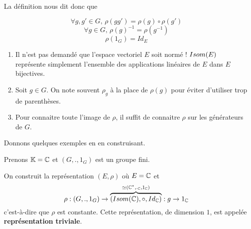 La définition nous dit donc que

\begin{equation}
	\forall g, g' \in G, \, \rho(g g') = \rho(g) \circ \rho(g')
\end{equation}
\begin{equation}
	\forall g \in G, \, \rho(g)^{-1} = \rho(g^{-1})
\end{equation}
\begin{equation}
	\rho(1_{G}) = Id_{E}
\end{equation}

\begin{remarque}
	\begin{enumerate}
		\item Il n'est pas demandé que l'espace vectoriel $E$ soit normé !
			$Isom(E)$ représente simplement l'ensemble des
			applications linéaires de $E$ dans $E$ bijectives.
		\item Soit $g \in G$. On note souvent $\rho_{g}$ à la place de $\rho(g)$
			pour éviter d'utiliser trop de parenthèses.
		\item Pour connaitre toute l'image de $\rho$, il suffit de connaitre
			$\rho$ sur les générateurs de $G$.
	\end{enumerate}
\end{remarque}

Donnons quelques exemples en en construisant.

\begin{exemple}
	Prenons $\mathbb{K} = \mathbb{C}$ et $(G, ., 1_{G})$ est un groupe fini.

	On construit la représentation $(E, \rho)$ où $E = \mathbb{C}$ et
	\begin{equation}
		\rho : (G, ., 1_{G}) \rightarrow \overbrace{(Isom(\mathbb{C}),
		\circ, Id_{\mathbb{C}})}^{\simeq (\mathbb{C}^{*}, ._{\mathbb{C}}, 1_{\mathbb{C}})} : g \rightarrow 1_{\mathbb{C}}
	\end{equation}
	c'est-à-dire que $\rho$ est constante.
	Cette représentation, de dimension $1$, est appelée \textbf{représentation
	triviale}.
\end{exemple}

